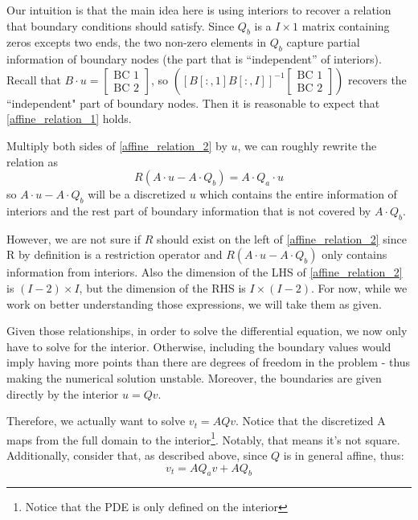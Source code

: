 \documentclass[11pt]{article}
\begin{document}
\begin{itemize}
Our intuition is that the main idea here is using interiors to recover a relation that boundary conditions should satisfy. Since $Q_b$ is a $I\times 1$ matrix containing zeros excepts two ends, the two non-zero elements in $Q_b$ capture partial information of boundary nodes (the part that is ``independent'' of interiors).  Recall that $B\cdot u =\begin{bmatrix}
\text{BC 1}\\
\text{BC 2}
\end{bmatrix} $, so $\left([B[:, 1] B[:, I]]^{-1}\begin{bmatrix}
\text{BC 1}\\
\text{BC 2}
\end{bmatrix}\right)$ recovers the ``independent" part of boundary nodes. Then it is reasonable to expect that \eqref{affine_relation_1} holds.

Multiply both sides of \eqref{affine_relation_2} by $u$, we can roughly rewrite the relation as
\begin{equation}
R(A\cdot u-A\cdot Q_b) = A\cdot Q_a\cdot u
\end{equation}
so $A\cdot u-A\cdot Q_b$ will be a discretized $u$ which contains the entire information of interiors and the rest part of boundary information that is not covered by $A\cdot Q_b$.

However, we are not sure if $R$ should exist on the left of \eqref{affine_relation_2} since R by definition is a restriction operator and $R(A\cdot u-A\cdot Q_b)$ only contains information from interiors. Also the dimension of the LHS of \eqref{affine_relation_2} is $(I-2)\times I$, but the dimension of the RHS is $I\times (I-2)$.
For now, while we work on better understanding those expressions, we will take them as given.

Given those relationships, in order to solve the differential equation, we now only have to solve for the interior. Otherwise, including the boundary values would imply having more points than there are degrees of freedom in the problem - thus making the numerical solution unstable. Moreover, the boundaries are given directly by the interior $u = Qv$.

Therefore, we actually want to solve $v_t = AQv$. Notice that the discretized A maps from the full domain to the interior\footnote{Notice that the PDE is only defined on the interior}. Notably, that means it's not square. Additionally, consider that, as described above, since $Q$ is in general affine, thus:
\begin{equation}
v_t = AQ_av + AQ_b
\end{equation}


\end{itemize}
\end{document}
